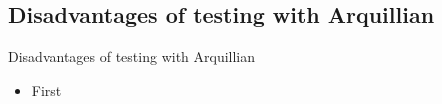 \subsection{Disadvantages of testing with Arquillian}
\begin{frame}{Disadvantages of testing with  Arquillian}
\begin{itemize}
\item First
\end{itemize}
\end{frame}
